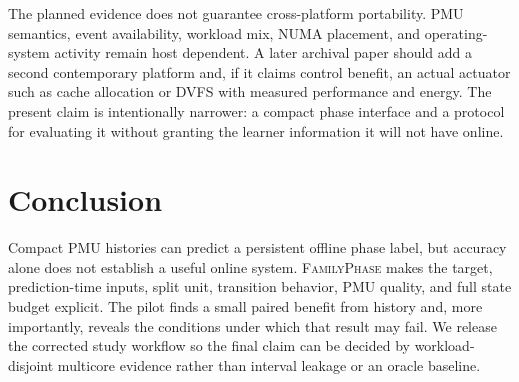 \documentclass{article}
\newcommand{\system}{\textsc{FamilyPhase}}
\begin{document}
The planned evidence does not guarantee cross-platform portability. PMU semantics,
event availability, workload mix, NUMA placement, and operating-system activity remain
host dependent. A later archival paper should add a second contemporary platform and,
if it claims control benefit, an actual actuator such as cache allocation or DVFS with
measured performance and energy. The present claim is intentionally narrower: a
compact phase interface and a protocol for evaluating it without granting the learner
information it will not have online.

\section{Conclusion}

Compact PMU histories can predict a persistent offline phase label, but accuracy alone
does not establish a useful online system. \system{} makes the target, prediction-time
inputs, split unit, transition behavior, PMU quality, and full state budget explicit.
The pilot finds a small paired benefit from history and, more importantly, reveals the
conditions under which that result may fail. We release the corrected study workflow
so the final claim can be decided by workload-disjoint multicore evidence rather than
interval leakage or an oracle baseline.

\clearpage


\end{document}

